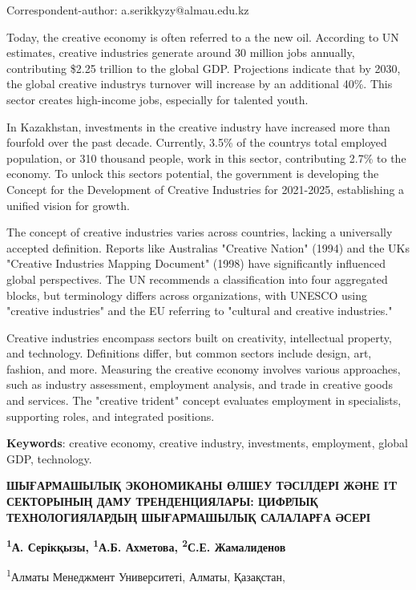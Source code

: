 Correspondent-author: a.serikkyzy@almau.edu.kz

Today, the creative economy is often referred to a the new oil.
According to UN estimates, creative industries generate around 30
million jobs annually, contributing \$2.25 trillion to the global GDP.
Projections indicate that by 2030, the global creative
industry\textquotesingle s turnover will increase by an additional 40\%.
This sector creates high-income jobs, especially for talented youth.

In Kazakhstan, investments in the creative industry have increased more
than fourfold over the past decade. Currently, 3.5\% of the
country\textquotesingle s total employed population, or 310 thousand
people, work in this sector, contributing 2.7\% to the economy. To
unlock this sector\textquotesingle s potential, the government is
developing the Concept for the Development of Creative Industries for
2021-2025, establishing a unified vision for growth.

The concept of creative industries varies across countries, lacking a
universally accepted definition. Reports like
Australia\textquotesingle s "Creative Nation" (1994) and the
UK\textquotesingle s "Creative Industries Mapping Document" (1998) have
significantly influenced global perspectives. The UN recommends a
classification into four aggregated blocks, but terminology differs
across organizations, with UNESCO using "creative industries" and the EU
referring to "cultural and creative industries."

Creative industries encompass sectors built on creativity, intellectual
property, and technology. Definitions differ, but common sectors include
design, art, fashion, and more. Measuring the creative economy involves
various approaches, such as industry assessment, employment analysis,
and trade in creative goods and services. The "creative trident" concept
evaluates employment in specialists, supporting roles, and integrated
positions.

{\bfseries Keywords}: creative economy, creative industry, investments,
employment, global GDP, technology.

{\bfseries ШЫҒАРМАШЫЛЫҚ ЭКОНОМИКАНЫ ӨЛШЕУ ТӘСІЛДЕРІ ЖӘНЕ IT СЕКТОРЫНЫҢ ДАМУ
ТРЕНДЕНЦИЯЛАРЫ: ЦИФРЛЫҚ ТЕХНОЛОГИЯЛАРДЫҢ ШЫҒАРМАШЫЛЫҚ САЛАЛАРҒА ӘСЕРІ}

{\bfseries \textsuperscript{1}А. Серікқызы, \textsuperscript{1}А.Б.
Ахметова, \textsuperscript{2}С.Е. Жамалиденов}

\textsuperscript{1}Алматы Менеджмент Университеті, Алматы, Қазақстан,

